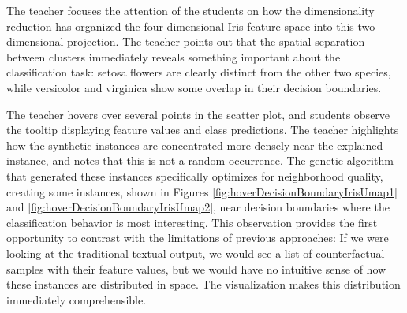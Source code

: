 The teacher focuses the attention of the students on how the dimensionality reduction has organized the four-dimensional Iris feature space into this two-dimensional projection. The teacher points out that the spatial separation between clusters immediately reveals something important about the classification task: setosa flowers are clearly distinct from the other two species, while versicolor and virginica show some overlap in their decision boundaries.

The teacher hovers over several points in the scatter plot, and students observe the tooltip displaying feature values and class predictions. The teacher highlights how the synthetic instances are concentrated more densely near the explained instance, and notes that this is not a random occurrence. The genetic algorithm that generated these instances specifically optimizes for neighborhood quality, creating some instances, shown in Figures \ref{fig:hoverDecisionBoundaryIrisUmap1} and \ref{fig:hoverDecisionBoundaryIrisUmap2}, near decision boundaries where the classification behavior is most interesting. This observation provides the first opportunity to contrast with the limitations of previous approaches: If we were looking at the traditional textual output, we would see a list of counterfactual samples with their feature values, but we would have no intuitive sense of how these instances are distributed in space. The visualization makes this distribution immediately comprehensible.

